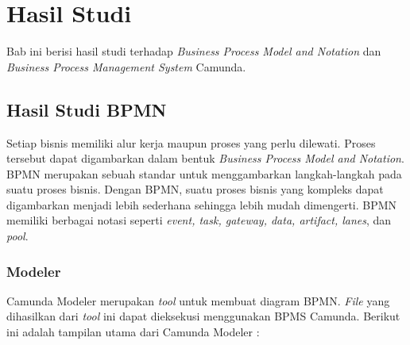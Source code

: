 \chapter{Hasil Studi}
\label{chap:studi}
Bab ini berisi hasil studi terhadap \textit{Business Process Model and Notation} dan \textit{Business Process Management System} Camunda. 

\section{Hasil Studi BPMN}
\label{sec:studibpmn}
Setiap bisnis memiliki alur kerja maupun proses yang perlu dilewati. Proses tersebut dapat digambarkan dalam bentuk \textit{Business Process Model and Notation}. BPMN merupakan sebuah standar untuk menggambarkan langkah-langkah pada suatu proses bisnis. Dengan BPMN, suatu proses bisnis yang kompleks dapat digambarkan menjadi lebih sederhana sehingga lebih mudah dimengerti. BPMN memiliki berbagai notasi seperti \textit{event, task, gateway, data, artifact, lanes}, dan \textit{pool}.  


\subsection{Modeler}
\label{modeler}
Camunda Modeler merupakan \textit{tool} untuk membuat diagram BPMN. \textit{File} yang dihasilkan dari \textit{tool} ini dapat dieksekusi menggunakan BPMS Camunda. Berikut ini adalah tampilan utama dari Camunda Modeler :

